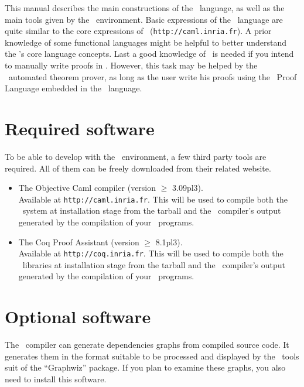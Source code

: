 This manual describes the main constructions of the \focal\ language,
as well as the main tools given by the \focal\ environment. Basic
expressions of the \focal\ language are quite similar to the core
expressions of \ocaml\
(\verb+http://caml.inria.fr+). A prior knowledge of some functional
languages might be helpful to better understand the \focal's core
language concepts. Last a good knowledge of \coq\ is needed if you
intend to manually write proofs in \focal{}. However, this task may be
helped by the \zenon\ automated theorem prover, as long as the user
write his proofs using the \focal\ Proof Language embedded in the
\focal\ language.



\section{Required software}
To be able to develop with the \focal\ environment, a few third party
tools are required. All of them can be freely downloaded from their
related website.
\begin{itemize}
  \item The Objective Caml compiler (version $\geq$ 3.09pl3). \\
    Available
    at \verb+http://caml.inria.fr+. This will be used to compile both
    the \focal\ system at installation stage from the tarball and
    the \focal\ compiler's output generated by the compilation of
    your \focal\ programs.

  \item The Coq Proof Assistant (version $\geq$ 8.1pl3). \\
     Available at
    \verb+http://coq.inria.fr+. This will be used to compile both
    the \focal\ libraries at installation stage from the tarball and
    the \focal\ compiler's output generated by the compilation of
    your \focal\ programs.
\end{itemize}



\section{Optional software}
The \focal\ compiler can generate dependencies graphs from compiled
source code. It generates them in the format suitable to be processed
and displayed by the \dotty\ tools suit of the ``Graphwiz'' package. If
you plan to examine these graphs, you also need to install this
software.




